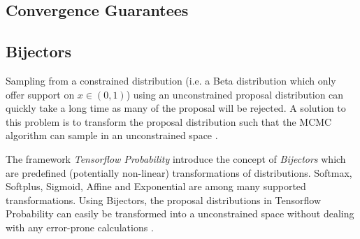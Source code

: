 \subsection{Convergence Guarantees}

\subsection{Bijectors}
Sampling from a constrained distribution (i.e. a Beta distribution which only offer support on $x \in (0, 1)$) using an unconstrained proposal distribution can quickly take a long time as many of the proposal will be rejected. A solution to this problem is to transform the proposal distribution such that the MCMC algorithm can sample in an unconstrained space \cite{Parno_2018, tensorflow2015-whitepaper}. 

The framework \textit{Tensorflow Probability} introduce the concept of \textit{Bijectors} which are predefined (potentially non-linear) transformations of distributions. Softmax, Softplus, Sigmoid, Affine and Exponential are among many supported transformations. Using Bijectors, the proposal distributions in Tensorflow Probability can easily be transformed into a unconstrained space without dealing with any error-prone calculations \cite{tensorflow2015-whitepaper}. 


